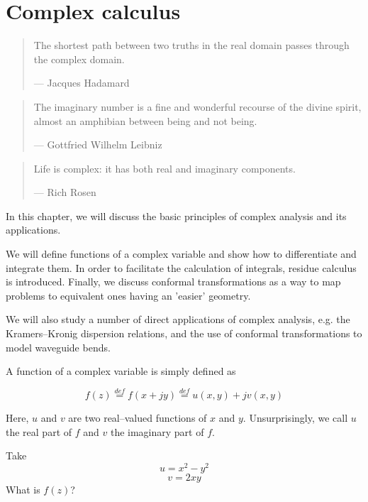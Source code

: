 \setchapterpreamble[u]{\margintoc}
\chapter{Complex calculus}
\label{h:complex}

\begin{quote}
The shortest path between two truths in the real domain passes through the complex domain.

--- Jacques Hadamard
\end{quote}

\begin{quote}
The imaginary number is a fine and wonderful recourse of the divine spirit, almost an amphibian between being and not being.

--- Gottfried Wilhelm Leibniz
\end{quote}

\begin{quote}
  Life is complex: it has both real and imaginary components.
  
--- Rich Rosen
\end{quote}

In this chapter, we will discuss the basic principles of complex analysis and its applications.

We will define functions of a complex variable and show how to differentiate and integrate them. In order to facilitate the calculation of integrals, residue calculus is introduced. Finally, we discuss conformal transformations as a way to map problems to equivalent ones having an 'easier' geometry. 

We will also study a number of direct applications of complex analysis, e.g. the Kramers--Kronig dispersion relations, and the use of conformal transformations to model waveguide bends.


A function of a complex variable is simply defined as

\begin{equation}
f(z) \stackrel{def}{=} f(x + j y) \stackrel{def}{=}  u(x,y) + j v(x,y)
\end{equation}

Here, $u$ and $v$ are two real--valued functions of $x$ and $y$. Unsurprisingly, we call $u$ the real part of $f$ and $v$ the imaginary part of $f$.

\begin{cue}
Take
$$u = x^2 - y^2$$
$$v = 2 x y$$
What is $f(z)$?
\end{cue}

